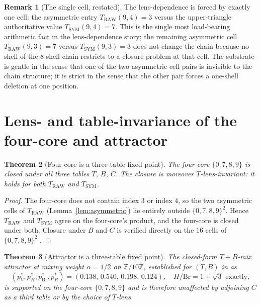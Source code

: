 \documentclass[11pt,reqno]{amsart}
\newtheorem{theorem}{Theorem}[section]
\theoremstyle{definition}
\newtheorem{remark}[theorem]{Remark}
\newcommand{\Z}{\mathbb{Z}}
\newcommand{\TRAW}{T_{\mathrm{RAW}}}
\newcommand{\TSYM}{T_{\mathrm{SYM}}}
\begin{document}
\begin{remark}[The single cell, restated]
\label{rem:single-cell}
The lens-dependence is forced by exactly one cell: the
asymmetric entry $\TRAW(9,4) = 3$ versus the upper-triangle
authoritative value $\TSYM(9,4) = 7$. This is the single most
load-bearing arithmetic fact in the lens-dependence story; the
remaining asymmetric cell $\TRAW(9,3) = 7$ versus
$\TSYM(9,3) = 3$ does not change the chain because no shell of
the $8$-shell chain restricts to a closure problem at that
cell. The substrate is gentle in the sense that one of the two
asymmetric cell pairs is invisible to the chain structure; it is
strict in the sense that the other pair forces a one-shell
deletion at one position.
\end{remark}

\section{Lens- and table-invariance of the four-core and attractor}
\label{sec:invariance}

\begin{theorem}[Four-core is a three-table fixed point]
\label{thm:four-core}
The four-core $\{0,7,8,9\}$ is closed under all three tables
$T$, $B$, $C$. The closure is moreover $T$-lens-invariant: it
holds for both $\TRAW$ and $\TSYM$.
\end{theorem}

\begin{proof}
The four-core does not contain index $3$ or index $4$, so the
two asymmetric cells of $\TRAW$ (Lemma~\ref{lem:asymmetric}) lie
entirely outside $\{0,7,8,9\}^2$. Hence $\TRAW$ and $\TSYM$ agree
on the four-core's product, and the four-core is closed under
both. Closure under $B$ and $C$ is verified directly on the
$16$ cells of $\{0,7,8,9\}^2$ \cite{Gen13Foundations,SFM2026}.
\end{proof}

\begin{theorem}[Attractor is a three-table fixed point]
\label{thm:attractor}
The closed-form $T+B$-mix attractor at mixing weight $\alpha=1/2$
on $\Z/10\Z$, established for $(T,B)$ in
\cite{Sanders2026Attractor,Sanders2026FourCore} as
\[
  (p^*_V, p^*_H, p^*_{\mathrm{Br}}, p^*_R) =
  (0.138,\, 0.540,\, 0.198,\, 0.124),
  \quad H/\mathrm{Br} = 1+\sqrt{3} \text{ exactly},
\]
is supported on the four-core $\{0,7,8,9\}$ and is therefore
unaffected by adjoining $C$ as a third table or by the choice of
$T$-lens.
\end{theorem}
\end{document}
